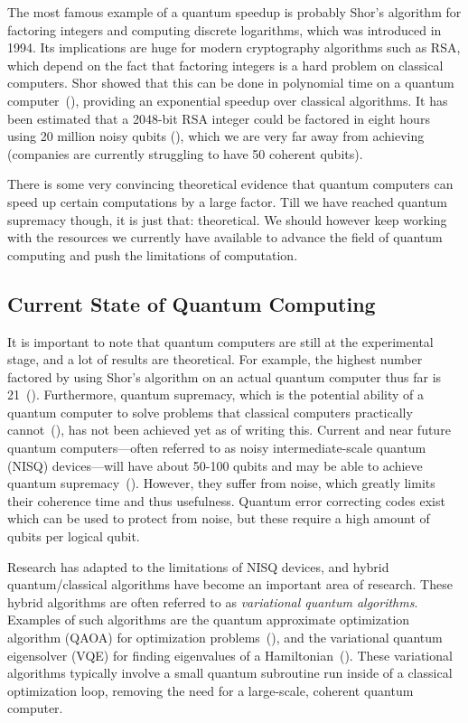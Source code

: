 \documentclass[a4paper,10pt]{article}
\begin{document}
The most famous example of a quantum speedup is probably Shor's algorithm for factoring integers and computing discrete logarithms, which was introduced in 1994.
Its implications are huge for modern cryptography algorithms such as RSA, which depend on the fact that factoring integers is a hard problem on classical computers.
Shor showed that this can be done in polynomial time on a quantum computer~(\cite{shor-factoring}), providing an exponential speedup over classical algorithms. 
It has been estimated that a 2048-bit RSA integer could be factored in eight hours using 20 million noisy qubits (\cite{shor-20mil}), which we are very far away from achieving (companies are currently struggling to have 50 coherent qubits).

There is some very convincing theoretical evidence that quantum computers can speed up certain computations by a large factor.
Till we have reached quantum supremacy though, it is just that: theoretical.
We should however keep working with the resources we currently have available to advance the field of quantum computing and push the limitations of computation.

\subsection{Current State of Quantum Computing}
It is important to note that quantum computers are still at the experimental stage, and a lot of results are theoretical.
For example, the highest number factored by using Shor's algorithm on an actual quantum computer thus far is 21~(\cite{shor-21}).
Furthermore, quantum supremacy, which is the potential ability of a quantum computer to solve problems that classical computers practically cannot~(\cite{preskill-qc}), has not been achieved yet as of writing this.
Current and near future quantum computers---often referred to as noisy intermediate-scale quantum (NISQ) devices---will have about 50-100 qubits and may be able to achieve quantum supremacy~(\cite{preskill-nisq}).
However, they suffer from noise, which greatly limits their coherence time and thus usefulness.
Quantum error correcting codes exist which can be used to protect from noise, but these require a high amount of qubits per logical qubit.

Research has adapted to the limitations of NISQ devices, and hybrid quantum/classical algorithms have become an important area of research.
These hybrid algorithms are often referred to as \emph{variational quantum algorithms}.
Examples of such algorithms are the quantum approximate optimization algorithm (QAOA) for optimization problems~(\cite{qaoa}), and the variational quantum eigensolver (VQE) for finding eigenvalues of a Hamiltonian~(\cite{vqe}).
These variational algorithms typically involve a small quantum subroutine run inside of a classical optimization loop, removing the need for a large-scale, coherent quantum computer.
\end{document}
